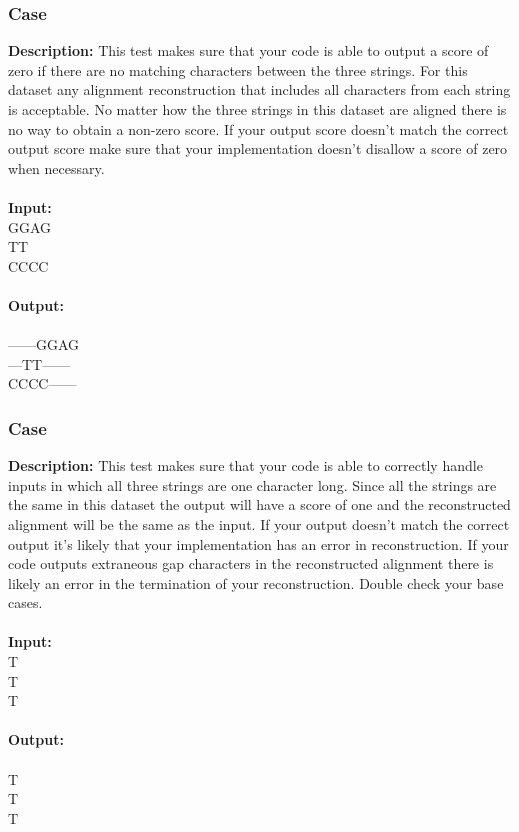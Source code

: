 \documentclass{article}
\newcommand{\code}[1]{{\fontfamily{pcr}\selectfont #1}}
\begin{document}
\subsubsection*{Case }
\hline \vspace{5}
\textbf{Description:} This test makes sure that your code is able to output a score of zero if there are no matching characters between the three strings. For this dataset any alignment reconstruction that includes all characters from each string is acceptable. No matter how the three strings in this dataset are aligned there is no way to obtain a non-zero score. If your output score doesn’t match the correct output score make sure that your implementation doesn’t disallow a score of zero when necessary.\\ \\
\noindent \textbf{Input:}\\
\code{GGAG\\TT\\CCCC}\\ \\
\noindent \textbf{Output:}\\
\code{0\\------GGAG\\---TT------\\CCCC------}

\subsubsection*{Case }
\hline \vspace{5}
\textbf{Description:} This test makes sure that your code is able to correctly handle inputs in which all three strings are one character long. Since all the strings are the same in this dataset the output will have a score of one and the reconstructed alignment will be the same as the input. If your output doesn’t match the correct output it’s likely that your implementation has an error in reconstruction. If your code outputs extraneous gap characters in the reconstructed alignment there is likely an error in the termination of your reconstruction. Double check your base cases.\\ \\
\noindent \textbf{Input:}\\
\code{T\\T\\T}\\ \\
\noindent \textbf{Output:}\\
\code{1\\T\\T\\T}
\end{document}
